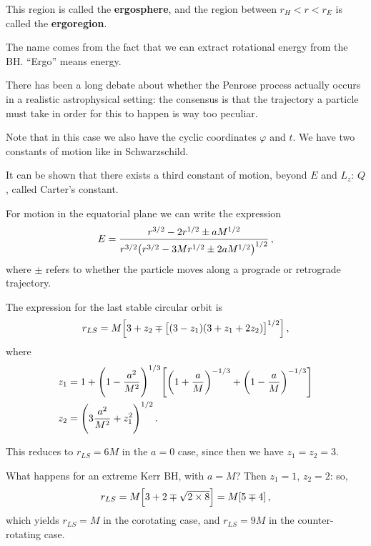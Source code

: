 \documentclass[main.tex]{subfiles}
\begin{document}
This region is called the \textbf{ergosphere}, and the region between \(r_H < r < r_E\) is called the \textbf{ergoregion}. 


The name comes from the fact that we can extract rotational energy from the BH. 
``Ergo'' means energy. 

There has been a long debate about whether the Penrose process actually occurs in a realistic astrophysical setting: the consensus is that the trajectory a particle must take in order for this to happen is way too peculiar. 

Note that in this case we also have the cyclic coordinates \(\varphi \) and \(t\). We have two constants of motion like in Schwarzschild. 

It can be shown that there exists a third constant of motion, beyond \(E\) and \(L_z\): \(Q\), called Carter's constant. 

For motion in the equatorial plane we can write the expression 
%
\begin{align}
E = \frac{r^{3/2} - 2 r^{1/2} \pm a M^{1/2}}{r^{3/2} \qty(r^{3/2}- 3M r^{1/2} \pm 2a M^{1/2})^{1/2}}
\,,
\end{align}
%
where \(\pm\) refers to whether the particle moves along a prograde or retrograde trajectory.

The expression for the last stable circular orbit is 
%
\begin{align}
r_{LS} = M \qty[ 3 + z_2 \mp \qty[(3 - z_1 ) (3 + z_1 +2z_2 )]^{1/2}]
\,,
\end{align}
%
where 
%
\begin{align}
z_1 &= 1 + \qty(1 - \frac{a^2}{M^2})^{1/3} \qty[\qty(1 + \frac{a}{M})^{-1/3} + \qty(1 - \frac{a}{M})^{-1/3}]  \\
z_2 &= \qty(3 \frac{a^2}{M^2} + z_1^2)^{1/2}
\,.
\end{align}

This reduces to \(r_{LS} = 6 M\) in the \(a = 0\) case, since then we have \(z_1 = z_2 = 3\). 

What happens for an extreme Kerr BH, with \(a = M\)? 
Then \(z_1 = 1\), \(z_2 = 2\): so, 
%
\begin{align}
r_{LS} = M \qty[3 + 2 \mp \sqrt{2 \times 8}] = M \qty[5 \mp 4]
\,,
\end{align}
%
which yields \(r_{LS} = M\) in the corotating case, and \(r_{LS} = 9M\) in the counter-rotating case.
\end{document}
